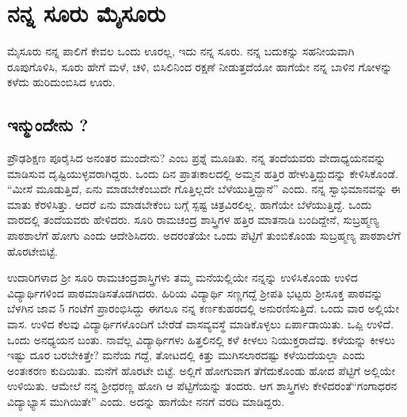 {\fontsize{14}{16}\selectfont
\chapter{ನನ್ನ ಸೂರು ಮೈಸೂರು}



ಮೈಸೂರು ನನ್ನ ಪಾಲಿಗೆ ಕೇವಲ ಒಂದು ಊರಲ್ಲ, ಇದು ನನ್ನ ಸೂರು.  ನನ್ನ ಬದುಕನ್ನು ಸಹನೀಯವಾಗಿ ರೂಪುಗೊಳಿಸಿ, ಸೂರು ಹೇಗೆ ಮಳೆ, ಚಳಿ, ಬಿಸಿಲಿನಿಂದ ರಕ್ಷಣೆ ನೀಡುತ್ತದೆಯೋ ಹಾಗೆಯೇ ನನ್ನ ಬಾಳಿನ ಗೋಳನ್ನು ಕಳೆದು ಹುರಿದುಂಬಿಸಿದ ಊರು.

\section*{ಇನ್ಮುಂದೇನು ?} 

ಪ್ರೌಢಶಿಕ್ಷಣ ಪೂರೈಸಿದ ಅನಂತರ ಮುಂದೇನು? ಎಂಬ ಪ್ರಶ್ನೆ ಮೂಡಿತು.  ನನ್ನ ತಂದೆಯವರು ವೇದಾಧ್ಯಯನವನ್ನು ಮಾಡಿಸುವ ದೃಷ್ಟಿಯುಳ್ಳವರಾಗಿದ್ದರು.  ಒಂದು ದಿನ ಪ್ರಾತಃಕಾಲದಲ್ಲಿ ಅಮ್ಮನ ಹತ್ತಿರ ಹೇಳುತ್ತಿದ್ದುದನ್ನು ಕೇಳಿಸಿಕೊಂಡೆ.  “ಮೀಸೆ ಮೂಡುತ್ತಿದೆ, ಏನು ಮಾಡಬೇಕೆಂಬುದೇ ಗೊತ್ತಿಲ್ಲದೇ ಬೆಳೆಯುತ್ತಿದ್ದಾನೆ” ಎಂದು.   ನನ್ನ ಸ್ವಾಭಿಮಾನವನ್ನು ಈ ಮಾತು ಕೆರಳಿಸಿತ್ತು.  ಆದರೆ ಏನು ಮಾಡಬೇಕೆಂಬ ಬಗ್ಗೆ ಸ್ಪಷ್ಟ ಚಿತ್ರವಿರಲಿಲ್ಲ.  ಹಾಗೆಯೇ ಬೆಳೆಯುತ್ತಿದ್ದೆ.  ಒಂದು ವಾರದಲ್ಲಿ ತಂದೆಯವರು ಹೇಳಿದರು.  ಸೂರಿ ರಾಮಚಂದ್ರ ಶಾಸ್ತ್ರಿಗಳ ಹತ್ತಿರ ಮಾತನಾಡಿ ಬಂದಿದ್ದೇನೆ, ಸುಬ್ರಹ್ಮಣ್ಯ ಪಾಠ\-ಶಾಲೆಗೆ ಹೋಗು ಎಂದು ಆದೇಶಿಸಿದರು. ಅದರಂತೆಯೇ ಒಂದು ಪೆಟ್ಟಿಗೆ ತುಂಬಿಕೊಂಡು ಸುಬ್ರಹ್ಮಣ್ಯ ಪಾಠಶಾಲೆಗೆ ಹೊರಟೇಬಿಟ್ಟೆ.  

ಉದಾರಿಗಳಾದ ಶ್ರೀ ಸೂರಿ ರಾಮಚಂದ್ರಶಾಸ್ತ್ರಿಗಳು ತಮ್ಮ ಮನೆಯಲ್ಲಿಯೇ ನನ್ನನ್ನು ಉಳಿಸಿಕೊಂಡು ಉಳಿದ ವಿದ್ಯಾರ್ಥಿಗಳಿಂದ ಪಾಠಮಾಡಿಸತೊಡಗಿದರು.  ಹಿರಿಯ ವಿದ್ಯಾರ್ಥಿ ಸಣ್ಣಗದ್ದೆ ಶ್ರೀಪತಿ ಭಟ್ಟರು ಶ್ರೀಸೂಕ್ತ ಪಾಠವನ್ನು ಬೆಳಗಿನ ಜಾವ 5 ಗಂಟೆಗೆ ಪ್ರಾರಂಭಿಸಿದ್ದು ಈಗಲೂ ನನ್ನ ಕರ್ಣಕುಹರದಲ್ಲಿ  ಅನುರಣಿಸುತ್ತಿದೆ.  ಒಂದು ವಾರ ಅಲ್ಲಿಯೇ ವಾಸ.  ಉಳಿದ ಕೆಲವು ವಿದ್ಯಾರ್ಥಿಗಳೊಂದಿಗೆ ಬೇರೆಡೆ ವಾಸವ್ಯವಸ್ಥೆ ಮಾಡಿಕೊಳ್ಳಲು ಏರ್ಪಾಡಾಯಿತು.  ಒಪ್ಪಿ ಉಳಿದೆ.  ಒಂದು ಅನಧ್ಯಯನ ಬಂತು.  ನಾವೆಲ್ಲ ವಿದ್ಯಾರ್ಥಿಗಳು ಹಿತ್ತಲಿನಲ್ಲಿ ಕಳೆ ಕೀಳಲು ನಿಯುಕ್ತರಾದೆವು.  ಕಳೆಯನ್ನು ಕೀಳಲು ಇಷ್ಟು ದೂರ ಬರಬೇಕಿತ್ತೇ? ಮನೆಯ ಗದ್ದೆ, ತೋಟದಲ್ಲಿ ಕಿತ್ತು ಮುಗಿಸಲಾರದಷ್ಟು ಕಳೆಯಿದೆಯಲ್ಲಾ ಎಂದು ಅಂತಃಕರಣ ಕುದಿಯಿತು.  ಮನೆಗೆ ಹೊರಟೇ ಬಿಟ್ಟೆ.  ಅಲ್ಲಿಗೆ ಹೋಗುವಾಗ ತೆಗೆದುಕೊಂಡು ಹೋದ ಪೆಟ್ಟಿಗೆ ಅಲ್ಲಿಯೇ ಉಳಿಯಿತು. ಆಮೇಲೆ ನನ್ನ ಶ್ರೀಧರಣ್ಣ ಹೋಗಿ ಆ ಪೆಟ್ಟಿಗೆಯನ್ನು ತಂದರು. ಆಗ ಶಾಸ್ತ್ರಿಗಳು ಕೇಳಿದರಂತೆ\break  “ಗಂಗಾಧರನ ವಿದ್ಯಾಭ್ಯಾಸ ಮುಗಿಯಿತೇ” ಎಂದು. ಅದನ್ನು ಹಾಗೆಯೇ ನನಗೆ ವರದಿ ಮಾಡಿದ್ದರು. 

}
